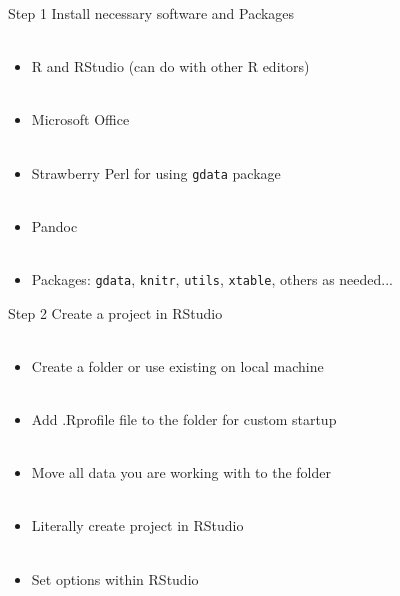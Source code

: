 \documentclass[xcolor=svgnames]{beamer}\usepackage{graphicx, color}
\begin{document}
\begin{frame}{Step 1}
Install necessary software and Packages \\~\\
\begin{itemize}
\item R and RStudio (can do with other R editors)\\~\\
\item Microsoft Office\\~\\
\item Strawberry Perl for using \texttt{gdata} package\\~\\
\item Pandoc\\~\\
\item Packages: \texttt{gdata}, \texttt{knitr}, \texttt{utils}, \texttt{xtable}, others as needed...
\end{itemize}
\end{frame}

\begin{frame}{Step 2}
Create a project in RStudio \\~\\
\begin{itemize}
\item Create a folder or use existing on local machine \\~\\
\item Add .Rprofile file to the folder for custom startup \\~\\
\item Move all data you are working with to the folder \\~\\
\item Literally create project in RStudio \\~\\
\item Set options within RStudio \\~\\
\end{itemize}
\end{frame}
\end{document}
